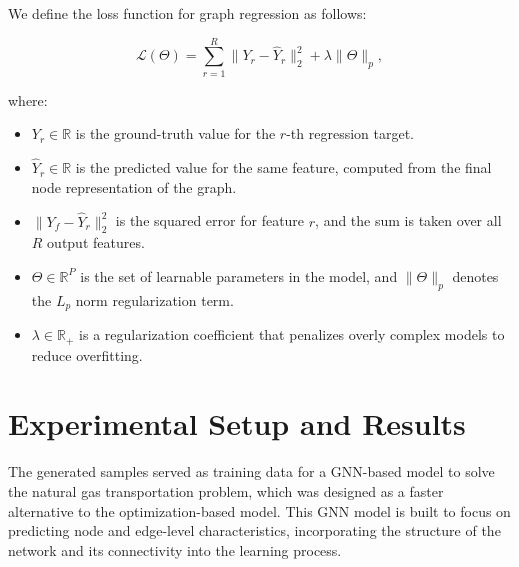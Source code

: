 We define the loss function for graph regression as follows:

\begin{equation}
    \mathcal{L}(\Theta) = \sum_{r=1}^{R} \| Y_r - \hat{Y}_r \|^2_2 + \lambda \|\Theta\|_p,
\end{equation}

\noindent where:

\begin{itemize}
    \item \( Y_r \in \mathbb{R} \) is the ground-truth value for the \( r \)-th regression target.
    \item \( \hat{Y}_r \in \mathbb{R} \) is the predicted value for the same feature, computed from the final node representation of the graph.
    \item \( \| Y_f - \hat{Y}_r \|^2_2 \) is the squared error for feature \( r \), and the sum is taken over all \( R \) output features.
    \item \( \Theta \in \mathbb{R}^{P} \) is the set of learnable parameters in the model, and \( \|\Theta\|_p \) denotes the \( L_p \) norm regularization term.
    \item \( \lambda \in \mathbb{R}_+ \) is a regularization coefficient that penalizes overly complex models to reduce overfitting.
\end{itemize}




\section{Experimental Setup and Results} \label{sec:LinealCensnet_ExperimentalSetup}

The generated samples served as training data for a GNN-based model to solve the natural gas transportation problem, which was designed as a faster alternative to the optimization-based model. This GNN model is built to focus on predicting node and edge-level characteristics, incorporating the structure of the network and its connectivity into the learning process. 


